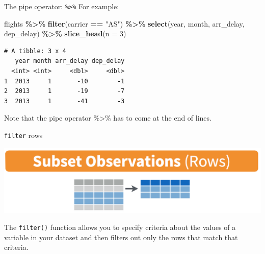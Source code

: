 \documentclass[
  ignorenonframetext,
]{beamer}
\newenvironment{Shaded}{\begin{snugshade}}{\end{snugshade}}
\newcommand{\AttributeTok}[1]{\textcolor[rgb]{0.13,0.29,0.53}{#1}}
\newcommand{\DecValTok}[1]{\textcolor[rgb]{0.00,0.00,0.81}{#1}}
\newcommand{\FunctionTok}[1]{\textcolor[rgb]{0.13,0.29,0.53}{\textbf{#1}}}
\newcommand{\NormalTok}[1]{#1}
\newcommand{\SpecialCharTok}[1]{\textcolor[rgb]{0.81,0.36,0.00}{\textbf{#1}}}
\newcommand{\StringTok}[1]{\textcolor[rgb]{0.31,0.60,0.02}{#1}}
\begin{document}
\begin{frame}[fragile]{The pipe operator: \texttt{\%\textgreater{}\%}}
\protect\hypertarget{the-pipe-operator-3}{}
For example:

\normalsize

\begin{Shaded}
\begin{Highlighting}[]
\NormalTok{flights }\SpecialCharTok{\%\textgreater{}\%} 
  \FunctionTok{filter}\NormalTok{(carrier }\SpecialCharTok{==} \StringTok{"AS"}\NormalTok{) }\SpecialCharTok{\%\textgreater{}\%} 
  \FunctionTok{select}\NormalTok{(year, month, arr\_delay, dep\_delay) }\SpecialCharTok{\%\textgreater{}\%} 
  \FunctionTok{slice\_head}\NormalTok{(}\AttributeTok{n =} \DecValTok{3}\NormalTok{)}
\end{Highlighting}
\end{Shaded}

\begin{verbatim}
# A tibble: 3 x 4
   year month arr_delay dep_delay
  <int> <int>     <dbl>     <dbl>
1  2013     1       -10        -1
2  2013     1       -19        -7
3  2013     1       -41        -3
\end{verbatim}

\normalsize

Note that the pipe operator \%\textgreater\% has to come at the end of
lines.
\end{frame}

\begin{frame}[fragile]{\texttt{filter} rows}
\protect\hypertarget{filter-rows}{}
\begin{center}\includegraphics[width=0.7\linewidth,height=0.4\textheight]{week3_1} \end{center}

The \texttt{filter()} function allows you to specify criteria about the
values of a variable in your dataset and then filters out only the rows
that match that criteria.
\end{frame}
\end{document}
